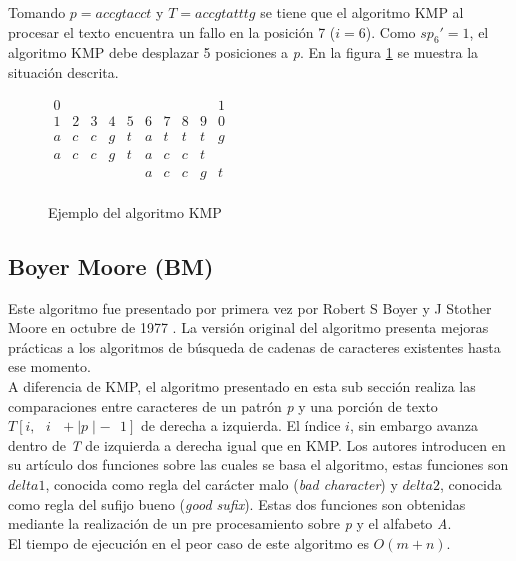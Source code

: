 \begin{example*}
Tomando $p = accgtacct$ y $T = accgtatttg$ se tiene que el algoritmo KMP al procesar el texto encuentra un fallo en la posición 7 ($i=6$). Como $sp_{6}' = 1$, el algoritmo KMP debe desplazar 5 posiciones a {\it p}. En la figura \ref{fig:matrix} se muestra la situación descrita.
\begin{center}
\begin{figure} [H]
\centering
$\begin{matrix}
0&   &   &   &   &   &   &   &   & 1\\
1& 2 & 3 & 4 & 5 & 6 & 7 & 8 & 9 & 0\\
a& c & c & g & t & a & t & t & t & g\\
a& c & c & g & t & a & c & c & t &  \\
 &   &   &   &   & a & c & c & g & t \\
\end{matrix}$
	\caption[Ejemplo del algoritmo KMP]{Ejemplo del algoritmo KMP}
	\label{fig:matrix}
\end{figure}
\end{center}
\end{example*}
\subsection{Boyer Moore (BM)}
Este algoritmo fue presentado por primera vez por Robert S Boyer y J Stother Moore en octubre de 1977 \cite{BM}. 
La versión original del algoritmo presenta mejoras prácticas a los algoritmos de búsqueda de cadenas de caracteres existentes hasta ese momento.\\
A diferencia de KMP, el algoritmo presentado en esta sub sección realiza las comparaciones entre caracteres de un patrón {\it p} y una porción de texto $T[i, \text{ } i \text{ } + \mid p \mid - \text{ } 1]$ de derecha a izquierda. El índice $i$, sin embargo avanza dentro de {\it T} de izquierda a derecha igual que en KMP.
Los autores introducen en su artículo dos funciones sobre las cuales se basa el algoritmo, estas funciones son $delta1$, conocida como regla del carácter malo ({\it bad character}) y $delta2$, conocida como regla del sufijo bueno ({\it good sufix}).
Estas dos funciones son obtenidas mediante la realización de un pre procesamiento sobre {\it p} y el alfabeto {\it A}.\\
El tiempo de ejecución en el peor caso de este algoritmo es $O(m + n)$.
